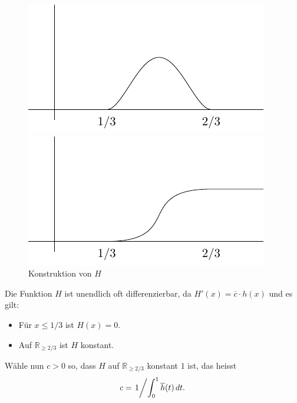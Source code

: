 \documentclass[../main.tex]{subfiles}
\begin{document}
\begin{examples}
\begin{enumerate}[(1)]
      \begin{figure}[htb] 
        \centering
        \begin{minipage}{0.50\textwidth}
          \centering
          \includegraphics{images/partition-integrand}
        \end{minipage}%
        \begin{minipage}{0.50\textwidth}
          \centering
          \includegraphics{images/partition-integrated}
        \end{minipage}%
        \caption{Konstruktion von $H$}%
        \label{fig:partition}
      \end{figure}

      Die Funktion $H$ ist unendlich oft differenzierbar,
      da $H'(x) = \overline c \cdot h(x)$ und es gilt:
       \begin{itemize}
         \item Für $x \leq 1/3$ ist $H(x) = 0$.
         \item Auf $\mathbb{R}_{\geq 2/3}$ ist $H$ konstant.
      \end{itemize}
      Wähle nun $c > 0$ so, dass $H$ 
      auf $\mathbb{R}_{\geq 2/3}$ konstant $1$ ist,
      das heisst
      \[
        c = \left. 1 \middle/ \int_{0}^{1} \overline h(t) \, dt.\right.
      \]
      

\end{enumerate}
\end{examples}
\end{document}
